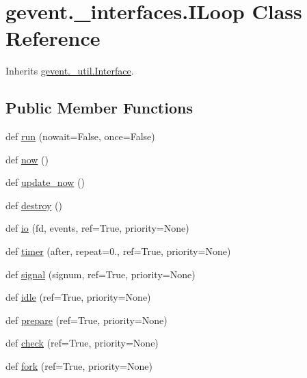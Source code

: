 \hypertarget{classgevent_1_1__interfaces_1_1_i_loop}{}\section{gevent.\+\_\+interfaces.\+I\+Loop Class Reference}
\label{classgevent_1_1__interfaces_1_1_i_loop}


Inherits \hyperlink{classgevent_1_1__util_1_1_interface}{gevent.\+\_\+util.\+Interface}.

\subsection*{Public Member Functions}
\begin{DoxyCompactItemize}
\item 
def \hyperlink{classgevent_1_1__interfaces_1_1_i_loop_a7f53dece62e43f3f57e37e5bb62d2c94}{run} (nowait=False, once=False)
\item 
def \hyperlink{classgevent_1_1__interfaces_1_1_i_loop_aec5c80eb8f80fc97f69630579a0aa469}{now} ()
\item 
def \hyperlink{classgevent_1_1__interfaces_1_1_i_loop_ac25c25cd6fc59358ceb64c26b88dc556}{update\+\_\+now} ()
\item 
def \hyperlink{classgevent_1_1__interfaces_1_1_i_loop_a7cfa09e2e74deecd8bc68891d8334104}{destroy} ()
\item 
def \hyperlink{classgevent_1_1__interfaces_1_1_i_loop_a223a81b01db7e75e1bbf4f0113e30f5b}{io} (fd, events, ref=True, priority=None)
\item 
def \hyperlink{classgevent_1_1__interfaces_1_1_i_loop_a7d6251104dbf1e3181696df8265a0fd3}{timer} (after, repeat=0., ref=True, priority=None)
\item 
def \hyperlink{classgevent_1_1__interfaces_1_1_i_loop_a015a1465fa9731920cbadab0cf735695}{signal} (signum, ref=True, priority=None)
\item 
def \hyperlink{classgevent_1_1__interfaces_1_1_i_loop_a7f29887a9b79a854c5631ac347e3d3bc}{idle} (ref=True, priority=None)
\item 
def \hyperlink{classgevent_1_1__interfaces_1_1_i_loop_a99382b16152552bc9a38100746f1323f}{prepare} (ref=True, priority=None)
\item 
def \hyperlink{classgevent_1_1__interfaces_1_1_i_loop_ae02c602ae5216043beeae4696295fb40}{check} (ref=True, priority=None)
\item 
def \hyperlink{classgevent_1_1__interfaces_1_1_i_loop_a74e8e81d3f018814e59d281b1d78d189}{fork} (ref=True, priority=None)

\end{DoxyCompactItemize}
